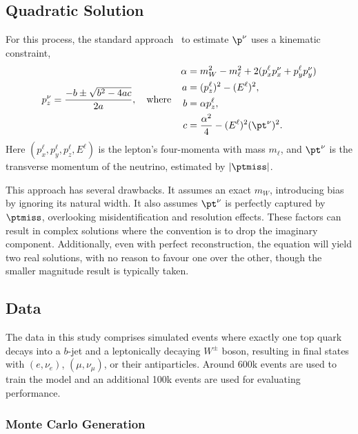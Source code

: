 \subsection{Quadratic Solution}

For this process, the standard approach~\cite{Quad1, Quad2, Quad4, Quad5} to estimate $\p^\nu$ uses a kinematic constraint,
\begin{equation}
    \label{eq:quadratic}
    p_z^\nu = \frac{-b \pm \sqrt{b^2-4ac}}{2a}, \quad \text{where} \quad
    \begin{aligned}
        \alpha & = m_W^2 - m_\ell^2+2(p_x^\ell p_x^\nu+p_y^\ell p_y^\nu) \\
        a      & = (p_z^\ell)^2 - (E^\ell)^2,                            \\
        b      & = \alpha p_z^\ell,                                      \\
        c      & = \frac{\alpha^2}{4}-(E^\ell)^2(\pt^\nu)^2.
    \end{aligned}
\end{equation}
Here $(p_x^\ell, p_y^\ell, p_z^\ell, E^\ell)$ is the lepton's four-momenta with mass $m_\ell$, and $\pt^\nu$ is the transverse momentum of the neutrino, estimated by $|\ptmiss|$.

This approach has several drawbacks.
It assumes an exact $m_W$, introducing bias by ignoring its natural width.
It also assumes $\pt^\nu$ is perfectly captured by $\ptmiss$, overlooking misidentification and resolution effects.
These factors can result in complex solutions where the convention is to drop the imaginary component.
Additionally, even with perfect reconstruction, the equation will yield two real solutions, with no reason to favour one over the other, though the smaller magnitude result is typically taken.

\subsection{Data}
\label{sec:data}

The data in this study comprises simulated \ttbar events where exactly one top quark decays into a $b$-jet and a leptonically decaying $W^\pm$ boson, resulting in final states with $(e,\nu_e)$, $(\mu,\nu_\mu)$, or their antiparticles.
Around 600k events are used to train the model and an additional 100k events are used for evaluating performance.

\subsubsection{Monte Carlo Generation}

